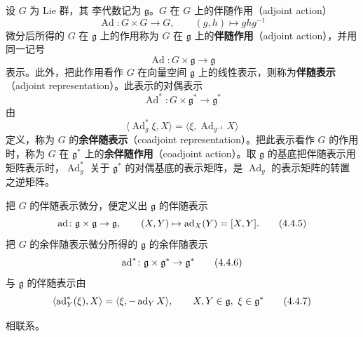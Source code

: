 设 $G$ 为 Lie 群，其 李代数记为 $\mathfrak{g}$。$G$ 在 $G$ 上的伴随作用（adjoint action）
\begin{equation}
  \operatorname{Ad}\colon G\times G\to G,\qquad (g,h)\mapsto ghg^{-1}
  \tag{4.4.1}
\end{equation}
微分后所得的 $G$ 在 $\mathfrak{g}$ 上的作用称为 $G$ 在 $\mathfrak{g}$ 上的\textbf{伴随作用}（adjoint action），并用同一记号
\begin{equation}
  \operatorname{Ad}\colon G\times\mathfrak{g}\to\mathfrak{g}
  \tag{4.4.2}
\end{equation}
表示。此外，把此作用看作 $G$ 在向量空间 $\mathfrak{g}$ 上的线性表示，则称为\textbf{伴随表示}（adjoint representation）。此表示的对偶表示
\begin{equation}
  \operatorname{Ad}^*\colon G\times\mathfrak{g}^*\to\mathfrak{g}^*
  \tag{4.4.3}
\end{equation}
由
\begin{equation}
  \langle\operatorname{Ad}^*_g\xi,X\rangle = \langle\xi,\operatorname{Ad}_{g^{-1}}X\rangle
  \tag{4.4.4}
\end{equation}
定义，称为 $G$ 的\textbf{余伴随表示}（coadjoint representation）。把此表示看作 $G$ 的作用时，称为 $G$ 在 $\mathfrak{g}^*$ 上的\textbf{余伴随作用}（coadjoint action）。取 $\mathfrak{g}$ 的基底把伴随表示用矩阵表示时，$\operatorname{Ad}^*_g$ 关于 $\mathfrak{g}^*$ 的对偶基底的表示矩阵，是 $\operatorname{Ad}_g$ 的表示矩阵的转置之逆矩阵。

把 $G$ 的伴随表示微分，便定义出 $\mathfrak{g}$ 的伴随表示
\begin{equation}
  \operatorname{ad}\colon\mathfrak{g}\times\mathfrak{g}\to\mathfrak{g},\qquad (X,Y)\mapsto\operatorname{ad}_X(Y) = [X,Y].
  \tag{4.4.5}
\end{equation}
把 $G$ 的余伴随表示微分所得的 $\mathfrak{g}$ 的余伴随表示
\begin{equation}
  \operatorname{ad}^*\colon\mathfrak{g}\times\mathfrak{g}^*\to\mathfrak{g}^*
  \tag{4.4.6}
\end{equation}
与 $\mathfrak{g}$ 的伴随表示由
\begin{equation}
  \langle\operatorname{ad}^*_Y(\xi),X\rangle = \langle\xi,-\operatorname{ad}_YX\rangle,\qquad
  X,Y\in\mathfrak{g},\ \xi\in\mathfrak{g}^*
  \tag{4.4.7}
\end{equation}

相联系。

